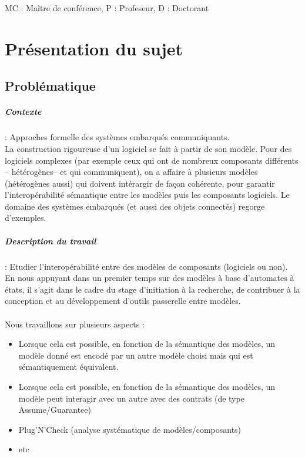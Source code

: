\documentclass[12pt,a4paper]{report}
\begin{document}
MC : Maître de conférence, P : Profeseur, D : Doctorant\\


\chapter{Présentation du sujet}
\section{Problématique}

\paragraph*{Contexte} : Approches formelle des systèmes embarqués communiquants.\\

La construction rigoureuse d'un logiciel se fait à partir de son modèle. Pour des logiciels complexes (par exemple ceux
qui ont de nombreux composants différents -- hétérogènes-- et qui communiquent), on a affaire à plusieurs modèles
(hétérogènes aussi) qui doivent intérargir de façon cohérente, pour garantir l'interopérabilité sémantique entre les
modèles puis les composants logiciels. Le domaine des systèmes embarqués (et aussi des objets connectés) regorge
d'exemples.\\

\paragraph*{Description du travail} : Etudier l'interopérabilité entre des modèles de composants (logiciels ou non).\\
En nous appuyant dans un premier temps sur des modèles à base d'automates à états, il s'agit dans le cadre du stage
d'initiation à la recherche, de contribuer à la conception et au développement d'outils passerelle entre modèles.\\\\

Nous travaillons sur plusieurs aspects :\\
\begin{itemize}
  \item Lorsque cela est possible, en fonction de la sémantique des modèles, un modèle donné est encodé par un autre
modèle choisi mais qui est sémantiquement équivalent.
  \item Lorsque cela est possible, en fonction de la sémantique des modèles, un modèle peut interagir avec un autre avec
des contrats (de type Assume/Guarantee)
  \item Plug'N'Check (analyse systématique de modèles/composants)
  \item etc
\end{itemize}
\end{document}
